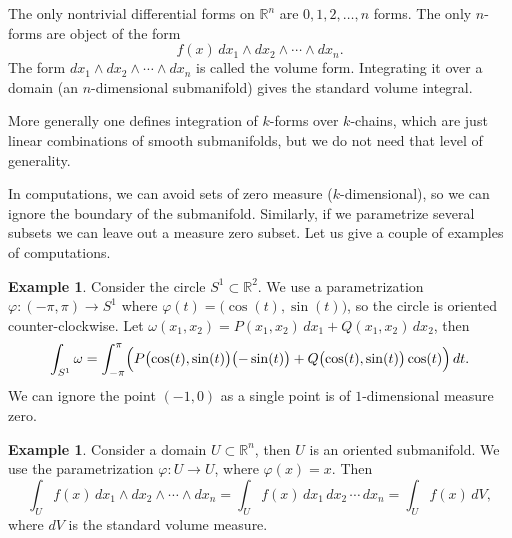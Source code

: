 \documentclass[12pt,openany]{book}
\newcommand{\R}{{\mathbb{R}}}
\theoremstyle{plain}
\theoremstyle{remark}
\theoremstyle{definition}
\theoremstyle{exercise}
\theoremstyle{example}
\newtheorem{example}[thm]{Example}
\begin{document}
The only nontrivial differential forms on $\R^n$
are $0,1,2,\ldots,n$ forms.  The only $n$-forms are
object of the form
\begin{equation*}
f(x) \,
dx_1 \wedge dx_2 \wedge \cdots \wedge dx_n .
\end{equation*}
The form $dx_1 \wedge dx_2 \wedge \cdots \wedge dx_n$ is called the
volume form.  Integrating it over a domain (an $n$-dimensional submanifold)
gives the standard volume integral.

More generally one defines integration of $k$-forms over $k$-chains,
which are just linear combinations of smooth submanifolds, but we do not
need that level of generality.

\medskip

In computations, we can avoid sets of zero measure ($k$-dimensional),
so we can ignore the boundary of the submanifold.  Similarly, if we parametrize
several subsets we can leave out a measure zero subset.
Let us give a couple of examples of computations.

\begin{example} \label{example:diffformscircleint}
Consider the circle $S^1 \subset
\R^2$.  We use a parametrization $\varphi \colon (-\pi,\pi) \to S^1$
where $\varphi(t) = \bigl(\cos(t),\sin(t)\bigr)$, so the circle is oriented
counter-clockwise.
Let $\omega(x_1,x_2) = P(x_1,x_2) \, dx_1 + Q(x_1,x_2) \, dx_2$, then
\begin{equation*}
\int_{S^1} \omega =
\int_{-\pi}^{\pi} 
\Bigl(
P\bigl(\cos(t),\sin(t)\bigr) \bigl(-\sin(t)\bigr)  +
Q\bigl(\cos(t),\sin(t)\bigr) \cos(t) \Bigr) \, dt .
\end{equation*}
We can ignore the point $(-1,0)$ as a single point is of $1$-dimensional
measure zero.
\end{example}

\begin{example}
Consider a domain $U \subset \R^n$, then $U$ is an oriented submanifold.
We use the parametrization $\varphi \colon U \to U$, where $\varphi(x) =
x$.  Then
\begin{equation*}
\int_U f(x) \, dx_1 \wedge dx_2 \wedge \cdots \wedge dx_n
=
\int_U f(x) \, dx_1 \, dx_2 \,  \cdots \, dx_n
=
\int_U f(x) \, dV ,
\end{equation*}
where $dV$ is the standard volume measure.
\end{example}
\end{document}
